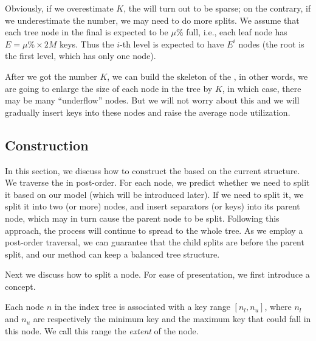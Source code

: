 Obviously, if we overestimate $K$, the \bptree will turn out
to be sparse; on the contrary, if we underestimate the number,
we may need to do more splits.  We assume that each tree node
in the final \bptree is expected to be $\mu$\% full, i.e.,
each leaf node has $E=\mu\% \times 2M$ keys.
Thus the $i$-th level is expected to have $E^i$ nodes (the root is the first level, which has only one node).

After we got the number $K$, we can build the skeleton of the \bptree, in other words, we are going to enlarge the size of each node in the tree by $K$, 
in which case, there may be many ``underflow'' nodes. But we will not worry about this and we will gradually insert keys into these nodes and raise the average
node utilization. 


\subsection{{\large \bptree} Construction} \label{subsec:model:warm:insertion}




In this section, we discuss how to construct the \bptree based on the current \bplustree structure. We traverse the \bplustree in post-order. For each node, we predict whether we need to split it based on our \predict model (which will be introduced later). If we need to split it, we split it
into two (or more) nodes, and insert separators (or keys)
into its parent node, which may in turn cause the parent node to be split.
Following this approach, the process will continue to spread to the whole tree. 
As we employ a post-order traversal, we can guarantee
that the child splits are before the parent split,
and our method can keep a balanced tree structure.

Next we discuss how to split a \bplustree node. For ease of presentation, we first introduce a concept.

\begin{definition} \label{def:extent}
Each node $n$ in the index tree is associated with a key range $[n_l, n_u]$, where $n_l$ and $n_u$ are respectively the minimum key and the maximum key that could fall in this node. We call this range the \textit{extent} of the node.
\end{definition}

